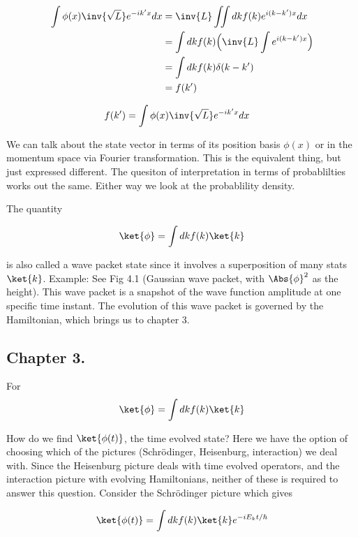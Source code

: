 \begin{align*}
\int \phi(x) \inv{\sqrt{L}} e^{-ik'x} dx
&= \inv{L} \iint dk f(k) e^{i(k-k')x} dx \\
&= \int dk f(k) \Bigl( \inv{L} \int e^{i(k-k')x} \Bigr) \\
&= \int dk f(k) \delta(k-k') \\
&= f(k')
\end{align*}

\begin{align*}
f(k') &=
\int \phi(x) \inv{\sqrt{L}} e^{-ik'x} dx
\end{align*}

We can talk about the state vector in terms of its position basis $\phi(x)$ or in the momentum space via Fourier transformation.  This is the equivalent thing, but just expressed different.  The quesiton of interpretation in terms of probablilties works out the same.  Either way we look at the probablility density.

The quantity

\begin{align*}
\ket{\phi} = \int dk f(k) \ket{k}
\end{align*}

is also called a wave packet state since it involves a superposition of many stats $\ket{k}$.  Example: See Fig 4.1 (Gaussian wave packet, with $\Abs{\phi}^2$ as the height).  This wave packet is a snapshot of the wave function amplitude at one specific time instant.  The evolution of this wave packet is governed by the Hamiltonian, which brings us to chapter 3.

\subsection{Chapter 3.}

For 
\begin{align*}
\ket{\phi} = \int dk f(k) \ket{k}
\end{align*}

How do we find $\ket{\phi(t)}$, the time evolved state?  Here we have the option of choosing which of the pictures (Schr\"{o}dinger, Heisenburg, interaction) we deal with.  Since the Heisenburg picture deals with time evolved operators, and the interaction picture with evolving Hamiltonians, neither of these is required to answer this question.  Consider the Schr\"{o}dinger picture which gives 

\begin{align*}
\ket{\phi(t)} = \int dk f(k) \ket{k} e^{-i E_k t/\hbar}
\end{align*}

